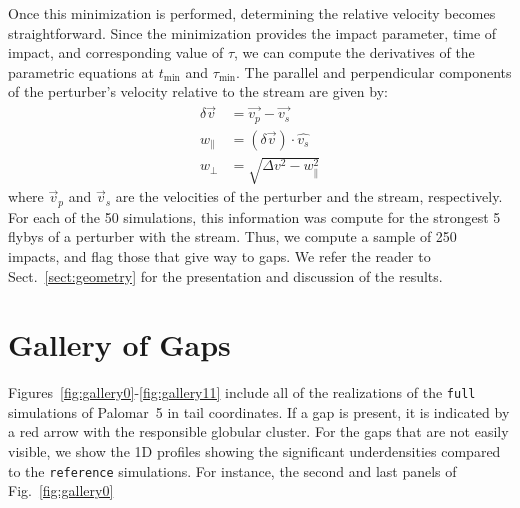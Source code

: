 \documentclass{aa}
\begin{document}
\begin{appendix}
      Once this minimization is performed, determining the relative velocity becomes straightforward. Since the minimization provides the impact parameter, time of impact, and corresponding value of $\tau$, we can compute the derivatives of the parametric equations at $t_{\text{min}}$ and $\tau_{\text{min}}$. The parallel and perpendicular components of the perturber's velocity relative to the stream are given by:
      \begin{equation}
        \begin{aligned}
          \delta \vec{v} &=\vec{v_p} - \vec{v_s} \\
          w_\parallel &= \left(\delta \vec{v}\right)\cdot \hat{v_s}\\  
          w_\perp &=  \sqrt{\Delta v ^2 - w_\parallel ^ 2}
          \end{aligned}
        \end{equation}
      where $\vec{v}_p$ and $\vec{v}_s$ are the velocities of the perturber and the stream, respectively. For each of the 50 simulations, this information was compute for the strongest 5 flybys of a perturber with the stream. Thus, we compute a sample of 250 impacts, and flag those that give way to gaps. We refer the reader to Sect.~\ref{sect:geometry} for the presentation and discussion of the results.




  \section{Gallery of Gaps} \label{sec:gallery_of_gaps}
    Figures~\ref{fig:gallery0}-\ref{fig:gallery11} include all of the realizations of the \texttt{full} simulations of Palomar~5 in tail coordinates. If a gap is present, it is indicated by a red arrow with the responsible globular cluster. For the gaps that are not easily visible, we show the 1D profiles  showing the significant underdensities compared to the \texttt{reference} simulations. For instance, the second and last panels of Fig.~\ref{fig:gallery0}


\end{appendix}
\end{document}
